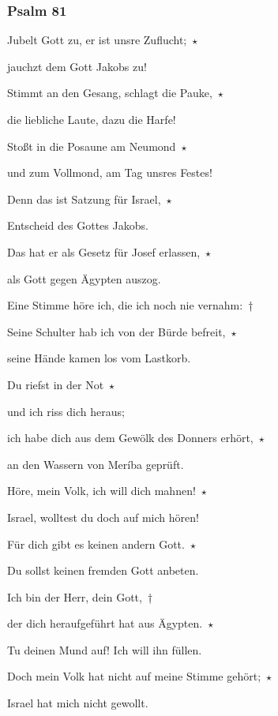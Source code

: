 \subsubsection{Psalm 81}

\noindent Jubelt Gott zu, er ist unsre Zuflucht;~$\star$~\nopagebreak

jauchzt dem Gott Jakobs zu!

\noindent Stimmt an den Gesang, schlagt die Pauke,~$\star$~\nopagebreak

die liebliche Laute, dazu die Harfe! 

\noindent Stoßt in die Posaune am Neumond~$\star$~\nopagebreak

und zum Vollmond, am Tag unsres Festes!

\noindent Denn das ist Satzung für Israel,~$\star$~\nopagebreak

Entscheid des Gottes Jakobs.

\noindent Das hat er als Gesetz für Josef erlassen,~$\star$~\nopagebreak

als Gott gegen Ägypten auszog.

\noindent Eine Stimme höre ich, die ich noch nie vernahm:~†~\nopagebreak

Seine Schulter hab ich von der Bürde befreit,~$\star$~\nopagebreak

seine Hände kamen los vom Lastkorb.

\noindent Du riefst in der Not~$\star$~\nopagebreak

und ich riss dich heraus;

\noindent ich habe dich aus dem Gewölk des Donners erhört,~$\star$~\nopagebreak

an den Wassern von Meríba geprüft.

\noindent Höre, mein Volk, ich will dich mahnen!~$\star$~\nopagebreak

Israel, wolltest du doch auf mich hören!

\noindent Für dich gibt es keinen andern Gott.~$\star$~\nopagebreak

Du sollst keinen fremden Gott anbeten.

\noindent Ich bin der Herr, dein Gott,~†~\nopagebreak

der dich heraufgeführt hat aus Ägypten.~$\star$~\nopagebreak

Tu deinen Mund auf! Ich will ihn füllen.

\noindent Doch mein Volk hat nicht auf meine Stimme gehört;~$\star$~\nopagebreak

Israel hat mich nicht gewollt.

